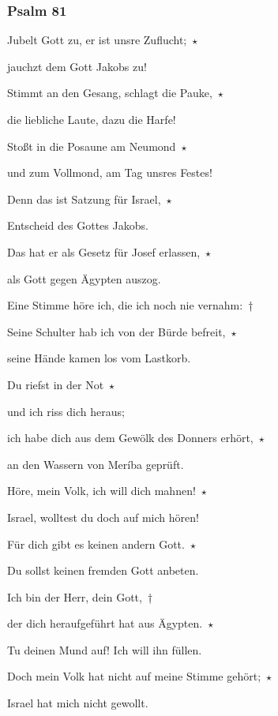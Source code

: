 \subsubsection{Psalm 81}

\noindent Jubelt Gott zu, er ist unsre Zuflucht;~$\star$~\nopagebreak

jauchzt dem Gott Jakobs zu!

\noindent Stimmt an den Gesang, schlagt die Pauke,~$\star$~\nopagebreak

die liebliche Laute, dazu die Harfe! 

\noindent Stoßt in die Posaune am Neumond~$\star$~\nopagebreak

und zum Vollmond, am Tag unsres Festes!

\noindent Denn das ist Satzung für Israel,~$\star$~\nopagebreak

Entscheid des Gottes Jakobs.

\noindent Das hat er als Gesetz für Josef erlassen,~$\star$~\nopagebreak

als Gott gegen Ägypten auszog.

\noindent Eine Stimme höre ich, die ich noch nie vernahm:~†~\nopagebreak

Seine Schulter hab ich von der Bürde befreit,~$\star$~\nopagebreak

seine Hände kamen los vom Lastkorb.

\noindent Du riefst in der Not~$\star$~\nopagebreak

und ich riss dich heraus;

\noindent ich habe dich aus dem Gewölk des Donners erhört,~$\star$~\nopagebreak

an den Wassern von Meríba geprüft.

\noindent Höre, mein Volk, ich will dich mahnen!~$\star$~\nopagebreak

Israel, wolltest du doch auf mich hören!

\noindent Für dich gibt es keinen andern Gott.~$\star$~\nopagebreak

Du sollst keinen fremden Gott anbeten.

\noindent Ich bin der Herr, dein Gott,~†~\nopagebreak

der dich heraufgeführt hat aus Ägypten.~$\star$~\nopagebreak

Tu deinen Mund auf! Ich will ihn füllen.

\noindent Doch mein Volk hat nicht auf meine Stimme gehört;~$\star$~\nopagebreak

Israel hat mich nicht gewollt.

